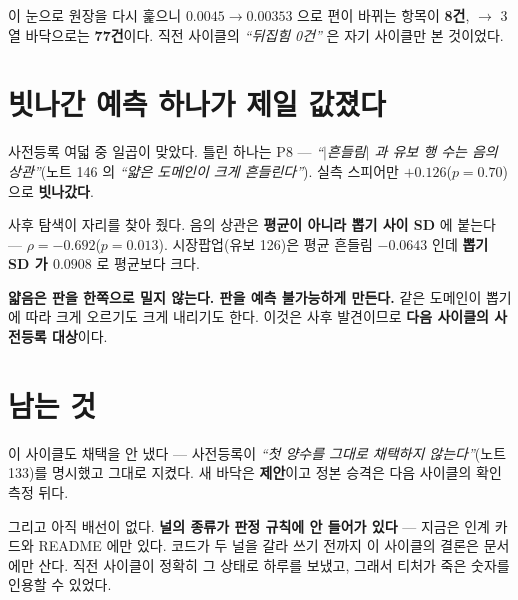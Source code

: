 \documentclass[10pt]{article}
\begin{document}
이 눈으로 원장을 다시 훑으니 $0.0045 \to 0.00353$ 으로 편이 바뀌는 항목이
\textbf{8건}, $\to$ 3열 바닥으로는 \textbf{77건}이다. 직전 사이클의
\emph{``뒤집힘 0건''} 은 자기 사이클만 본 것이었다.


\section{빗나간 예측 하나가 제일 값졌다}

사전등록 여덟 중 일곱이 맞았다. 틀린 하나는 P8 --- \emph{``$|$흔들림$|$ 과
유보 행 수는 음의 상관''}(노트 146 의 \emph{``얇은 도메인이 크게 흔들린다''}).
실측 스피어만 $+0.126$($p{=}0.70$) 으로 \textbf{빗나갔다}.

사후 탐색이 자리를 찾아 줬다. 음의 상관은 \textbf{평균이 아니라 뽑기 사이
SD} 에 붙는다 --- $\rho = -0.692$($p{=}0.013$). 시장팝업(유보 126)은 평균
흔들림 $-0.0643$ 인데 \textbf{뽑기 SD 가 $0.0908$} 로 평균보다 크다.

\textbf{얇음은 판을 한쪽으로 밀지 않는다. 판을 예측 불가능하게 만든다.}
같은 도메인이 뽑기에 따라 크게 오르기도 크게 내리기도 한다. 이것은 사후
발견이므로 \textbf{다음 사이클의 사전등록 대상}이다.

\section{남는 것}

이 사이클도 채택을 안 냈다 --- 사전등록이 \emph{``첫 양수를 그대로 채택하지
않는다''}(노트 133)를 명시했고 그대로 지켰다. 새 바닥은 \textbf{제안}이고
정본 승격은 다음 사이클의 확인 측정 뒤다.

그리고 아직 배선이 없다. \textbf{널의 종류가 판정 규칙에 안 들어가 있다} ---
지금은 인계 카드와 README 에만 있다. 코드가 두 널을 갈라 쓰기 전까지 이
사이클의 결론은 문서에만 산다. 직전 사이클이 정확히 그 상태로 하루를
보냈고, 그래서 티처가 죽은 숫자를 인용할 수 있었다.
\end{document}

